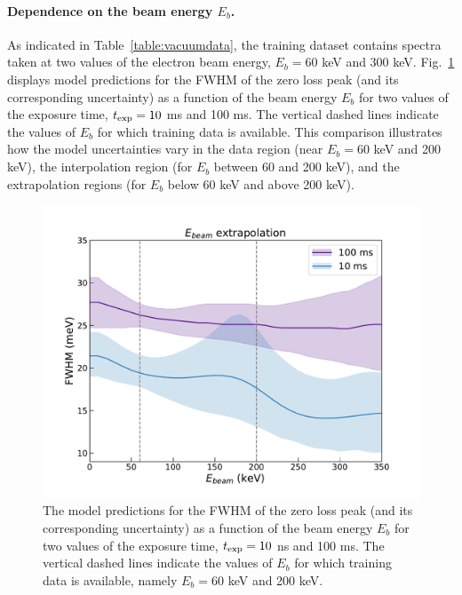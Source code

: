\paragraph{Dependence on the beam energy $E_b$.}
%
As indicated in Table~\ref{table:vacuumdata}, the training dataset contains
spectra taken at two values of the electron beam energy, $E_b=60$ keV and 300 keV.
%
Fig.~\ref{fig:extrapolbeam} displays  model predictions for the FWHM of the zero loss peak
      (and its corresponding uncertainty) as a function of the beam energy $E_b$
      for two values of the exposure time, $t_{\rm exp}=10$ ms and 100 ms.
      The vertical dashed lines indicate the values of $E_b$ for which training data is available.
      This comparison illustrates how the model uncertainties vary in the data region
      (near $E_b=60$ keV and 200 keV), the interpolation region (for $E_b$ between 60 and 200 keV),
      and the extrapolation regions (for $E_b$ below 60 keV and above 200 keV).
      
\begin{figure}[t]
    \centering
    \includegraphics[width=130mm]{plots/Ebeam_extrapolation.pdf}
    \caption{The model predictions for the FWHM of the zero loss peak
      (and its corresponding uncertainty) as a function of the beam energy $E_b$
      for two values of the exposure time, $t_{\rm exp}=10$ ns and 100 ms.
      The vertical dashed lines indicate the values of $E_b$ for which training data is available,
      namely $E_b=60$ keV and 200 keV.
    }
    \label{fig:extrapolbeam}
\end{figure}

